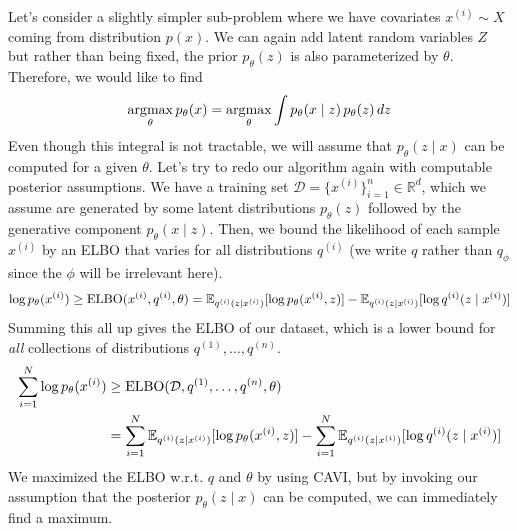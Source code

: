   Let's consider a slightly simpler sub-problem where we have covariates $x^{(i)} \sim X$ coming from distribution $p(x)$. We can again add latent random variables $Z$ but rather than being fixed, the prior $p_\theta (z)$ is also parameterized by $\theta$. Therefore, we would like to find 
  \begin{equation}
    \argmax_\theta p_\theta (x) = \argmax_\theta \int p_\theta (x \mid z) \, p_\theta (z) \,dz
  \end{equation} 
  Even though this integral is not tractable, we will assume that $p_\theta (z \mid x)$ can be computed for a given $\theta$. Let's try to redo our algorithm again with computable posterior assumptions. We have a training set $\mathcal{D} = \{x^{(i)}\}_{i=1}^n \in \mathbb{R}^d$, which we assume are generated by some latent distributions $p_\theta (z)$ followed by the generative component $p_\theta (x \mid z)$. Then, we bound the likelihood of each sample $x^{(i)}$ by an ELBO that varies for all distributions $q^{(i)}$ (we write $q$ rather than $q_\phi$ since the $\phi$ will be irrelevant here). 
  \begin{equation}
    \log p_{\theta} (x^{(i)}) \geq \elbo(x^{(i)}, q^{(i)}, \theta) = \mathbb{E}_{q^{(i)} (z \mid x^{(i)})} [ \log p_{\theta} (x^{(i)}, z)] - \mathbb{E}_{q^{(i)} (z \mid x^{(i)})} [ \log q^{(i)} (z \mid x^{(i)}) ]
  \end{equation} 
  Summing this all up gives the ELBO of our dataset, which is a lower bound for \textit{all} collections of distributions $q^{(1)}, \ldots, q^{(n)}$. 
  \begin{align}
    \sum_{i=1}^N \log p_{\theta} (x^{(i)}) & \geq \elbo(\mathcal{D}, q^{(1)}, \ldots, q^{(n)}, \theta) \\ 
                                           & = \sum_{i=1}^N \mathbb{E}_{q^{(i)} (z \mid x^{(i)})} [ \log p_{\theta} (x^{(i)}, z)] - \sum_{i=1}^N \mathbb{E}_{q^{(i)} (z \mid x^{(i)})} [ \log q^{(i)} (z \mid x^{(i)}) ]
  \end{align} 
  We maximized the ELBO w.r.t. $q$ and $\theta$ by using CAVI, but by invoking our assumption that the posterior $p_\theta (z \mid x)$ can be computed, we can immediately find a maximum. 

